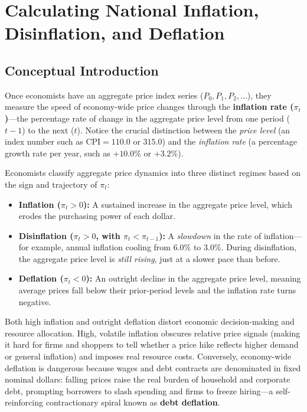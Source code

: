 \documentclass[11pt,letterpaper]{article}
\begin{document}
\section{Calculating National Inflation, Disinflation, and Deflation}

\subsection*{Conceptual Introduction}
Once economists have an aggregate price index series ($P_0, P_1, P_2, \dots$), they measure the speed of economy-wide price changes through the \textbf{inflation rate ($\pi_t$)}—the percentage rate of change in the aggregate price level from one period ($t-1$) to the next ($t$). Notice the crucial distinction between the \emph{price level} (an index number such as $\text{CPI} = 110.0$ or $315.0$) and the \emph{inflation rate} (a percentage growth rate per year, such as $+10.0\%$ or $+3.2\%$).

Economists classify aggregate price dynamics into three distinct regimes based on the sign and trajectory of $\pi_t$:
\begin{itemize}
    \item \textbf{Inflation ($\pi_t > 0$):} A sustained increase in the aggregate price level, which erodes the purchasing power of each dollar.
    \item \textbf{Disinflation ($\pi_t > 0$, with $\pi_t < \pi_{t-1}$):} A \emph{slowdown} in the rate of inflation—for example, annual inflation cooling from $6.0\%$ to $3.0\%$. During disinflation, the aggregate price level is \emph{still rising}, just at a slower pace than before.
    \item \textbf{Deflation ($\pi_t < 0$):} An outright decline in the aggregate price level, meaning average prices fall below their prior-period levels and the inflation rate turns negative.
\end{itemize}

Both high inflation and outright deflation distort economic decision-making and resource allocation. High, volatile inflation obscures relative price signals (making it hard for firms and shoppers to tell whether a price hike reflects higher demand or general inflation) and imposes real resource costs. Conversely, economy-wide deflation is dangerous because wages and debt contracts are denominated in fixed nominal dollars: falling prices raise the real burden of household and corporate debt, prompting borrowers to slash spending and firms to freeze hiring—a self-reinforcing contractionary spiral known as \textbf{debt deflation}.
\end{document}
